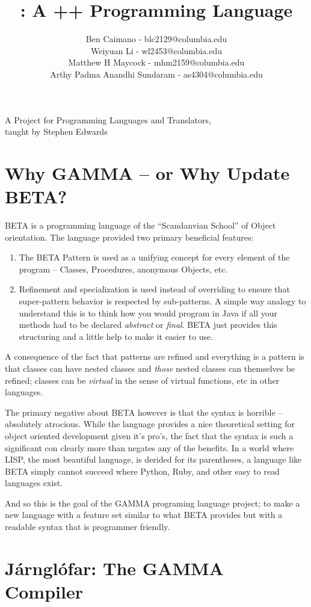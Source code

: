 \documentclass[10pt]{article}
\title{\Lang{}: A \OLang{}++ Programming Language}
\author{
	Ben Caimano - blc2129@columbia.edu \\
	Weiyuan Li - wl2453@columbia.edu \\
	Matthew H Maycock - mhm2159@columbia.edu \\
	Arthy Padma Anandhi Sundaram - as4304@columbia.edu
}
\date{}
\newcommand{\Lang}{GAMMA}
\newcommand{\Compiler}{J\'arngl\'ofar}
\newcommand{\OLang}{BETA}
\begin{document}
\maketitle
\begin{center}
\large
A Project for Programming Languages and Translators,
\\taught by Stephen Edwards
\end{center}


\section*{Why \Lang{} -- or Why Update \OLang{}?}
\OLang{} is a programming language of the ``Scandanvian School'' of Object
orientation. The language provided two primary beneficial features:

\begin{enumerate}
\item The \OLang{} Pattern is used as a unifying concept for every element
of the program -- Classes, Procedures, anonymous Objects, etc.
\item Refinement and specialization is used instead of overriding to
ensure that super-pattern behavior is respected by sub-patterns. A
simple way analogy to understand this is to think how you would program
in Java if all your methods had to be declared \emph{abstract} or
\emph{final}. \OLang{} just provides this structuring and a little help to
make it easier to use.
\end{enumerate}

A consequence of the fact that patterns are refined and everything is a
pattern is that classes can have nested classes and \emph{those} nested
classes can themselves be refined; classes can be \emph{virtual} in the
sense of virtual functions, etc in other languages.

The primary negative about \OLang{} however is that the syntax is horrible
-- absolutely atrocious. While the language provides a nice theoretical
setting for object oriented development given it's pro's, the fact that
the syntax is such a significant con clearly more than negates any of
the benefits. In a world where LISP, the most beautiful language, is
derided for its parentheses, a language like \OLang{} simply cannot succeed
where Python, Ruby, and other easy to read languages exist.

And so this is the goal of the \Lang{} programing language project; to
make a new language with a feature set similar to what \OLang{} provides
but with a readable syntax that is programmer friendly.

\section*{\Compiler{}: The \Lang{} Compiler}
\end{document}
